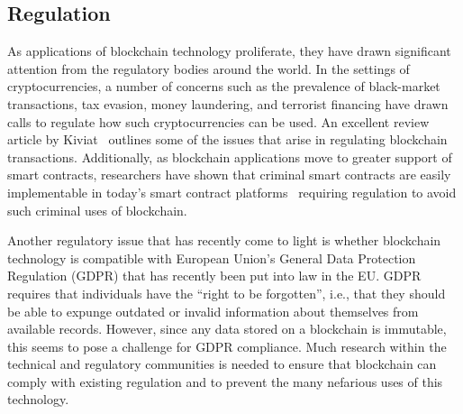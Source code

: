 \subsection{Regulation}
As applications of blockchain technology proliferate, they have drawn significant attention from the regulatory bodies around the world.  In the settings of cryptocurrencies, a number of concerns such as the prevalence of black-market transactions, tax evasion, money laundering, and terrorist financing have drawn calls to regulate how such cryptocurrencies can be used.  An excellent review article by Kiviat~\cite{Kiviat15} outlines some of the issues that arise in regulating blockchain transactions.  Additionally, as blockchain applications move to greater support of smart contracts, researchers have shown that criminal smart contracts are easily implementable in today's smart contract platforms~\cite{CCS:JueKosShi16} requiring regulation to avoid such criminal uses of blockchain.  

Another regulatory issue that has recently come to light is whether blockchain technology is compatible with European Union's General Data Protection Regulation (GDPR) that has recently been put into law in the EU.  GDPR requires that individuals have the ``right to be forgotten'', i.e., that they should be able to expunge outdated or invalid information about themselves from available records.  However, since any data stored on a blockchain is immutable, this seems to pose a challenge for GDPR compliance.  Much research within the technical and regulatory communities is needed to ensure that blockchain can comply with existing regulation and to prevent the many nefarious uses of this technology.

